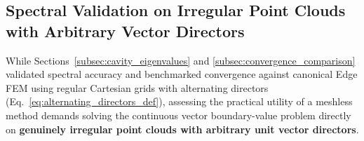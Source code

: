 \documentclass[preprint,12pt]{elsarticle}
\begin{document}
\subsection{Spectral Validation on Irregular Point Clouds with Arbitrary Vector Directors}
\label{subsec:spectral_irregular_clouds}

While Sections~\ref{subsec:cavity_eigenvalues} and \ref{subsec:convergence_comparison} validated spectral accuracy and benchmarked convergence against canonical Edge FEM using regular Cartesian grids with alternating directors (Eq.~\eqref{eq:alternating_directors_def}), assessing the practical utility of a meshless method demands solving the continuous vector boundary-value problem directly on \textbf{genuinely irregular point clouds with arbitrary unit vector directors}.
\end{document}
